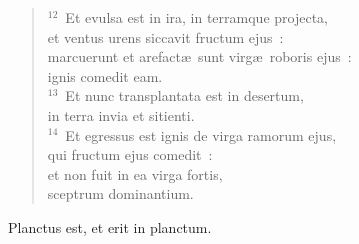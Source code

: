 \begin{verse}
${}^{12}$~Et evulsa est in ira, in terramque projecta,\\ et ventus urens siccavit fructum ejus~:\\ marcuerunt et arefact\ae\ sunt virg\ae\ roboris ejus~:\\ ignis comedit eam.\\
${}^{13}$~Et nunc transplantata est in desertum,\\ in terra invia et sitienti.\\
${}^{14}$~Et egressus est ignis de virga ramorum ejus,\\ qui fructum ejus comedit~:\\ et non fuit in ea virga fortis,\\ sceptrum dominantium.\end{verse}

 Planctus est, et erit in planctum.

